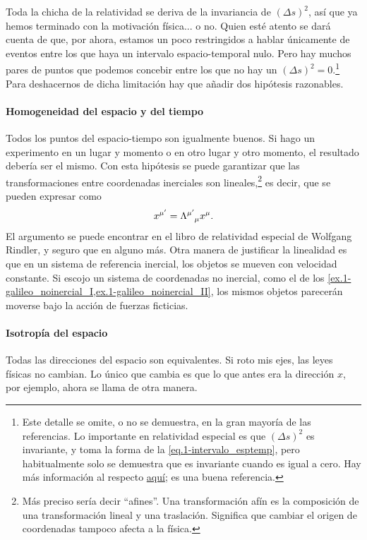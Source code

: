 Toda la chicha de la relatividad se deriva de la invariancia de \(\left(\Delta s\right)^2\), así que ya hemos terminado con la motivación física... o no. Quien esté atento se dará cuenta de que, por ahora, estamos un poco restringidos a hablar únicamente de eventos entre los que haya un intervalo espacio-temporal nulo. Pero hay muchos pares de puntos que podemos concebir entre los que no hay un \(\left(\Delta s\right)^2 = 0\).\footnote{Este detalle se omite, o no se demuestra, en la gran mayoría de las referencias. Lo importante en relatividad especial es que \(\left(\Delta s\right)^2\) es invariante, y toma la forma de la \cref{eq.1-intervalo_esptemp}, pero habitualmente solo se demuestra que es invariante cuando es igual a cero. Hay más información al respecto \href{https://arxiv.org/abs/0904.3913}{aquí}; es una buena referencia.} Para deshacernos de dicha limitación hay que añadir dos hipótesis razonables.

\paragraph{Homogeneidad del espacio y del tiempo} Todos los puntos del espacio-tiempo son igualmente buenos. Si hago un experimento en un lugar y momento o en otro lugar y otro momento, el resultado debería ser el mismo.  Con esta hipótesis se puede garantizar que las transformaciones entre coordenadas inerciales son lineales,\footnote{Más preciso sería decir ``afines''. Una transformación afín es la composición de una transformación lineal y una traslación. Significa que cambiar el origen de coordenadas tampoco afecta a la física.} es decir, que se pueden expresar como
\begin{equation*}
    x^{\mu'} = \tensor{\Lambda}{^{\mu'}_\mu} x^\mu.
\end{equation*}
El argumento se puede encontrar en el libro de relatividad especial de Wolfgang Rindler, y seguro que en alguno más. Otra manera de justificar la linealidad es que en un sistema de referencia inercial, los objetos se mueven con velocidad constante. Si escojo un sistema de coordenadas no inercial, como el de los \cref{ex.1-galileo_noinercial_I,ex.1-galileo_noinercial_II}, los mismos objetos parecerán moverse bajo la acción de fuerzas ficticias. 

\paragraph{Isotropía del espacio} Todas las direcciones del espacio son equivalentes. Si roto mis ejes, las leyes físicas no cambian. Lo único que cambia es que lo que antes era la dirección \(x\), por ejemplo, ahora se llama de otra manera.

